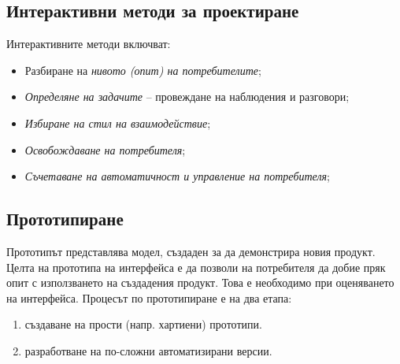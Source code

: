 \documentclass[fleqn,12pt]{article}
\begin{document}
\subsection{Интерактивни методи за проектиране}

Интерактивните методи включват:
\begin{itemize}
    \item Разбиране на \textit{нивото (опит) на потребителите};
    \item \textit{Определяне на задачите} – провеждане на наблюдения и разговори;
    \item \textit{Избиране на стил на взаимодействие};
    \item \textit{Освобождаване на потребителя};
    \item \textit{Съчетаване на автоматичност и управление на потребителя};
\end{itemize}

\subsection{Прототипиране}

Прототипът представлява модел, създаден за да демонстрира новия продукт.
Целта на прототипа на интерфейса е да позволи на потребителя да добие пряк опит с използването на създадения продукт.
Това е необходимо при оценяването на интерфейса.
Процесът по прототипиране е на два етапа:
\begin{enumerate}
    \item създаване на прости (напр. хартиени) прототипи.
    \item разработване на по-сложни автоматизирани версии.
\end{enumerate}
\end{document}
